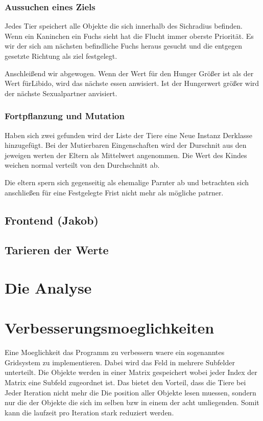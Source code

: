 \documentclass[12pt]{article}
\begin{document}
\subsubsection{Aussuchen eines Ziels}
Jedes Tier speichert alle Objekte die sich innerhalb des Sichradius befinden.
Wenn ein Kaninchen ein Fuchs sieht hat die Flucht immer oberste Priorität.
Es wir der sich am nächsten befindliche Fuchs heraus gesucht und die entgegen gesetzte Richtung als ziel festgelegt.

Anschleißend wir abgewogen.
Wenn der Wert für den Hunger Größer ist als der Wert fürLibido, wird das nächste essen anwisiert.
Ist der Hungerwert größer wird der nächste Sexualpartner anvisiert.
\subsubsection{Fortpflanzung und Mutation}
Haben sich zwei gefunden wird der Liste der Tiere eine Neue Instanz Derklasse hinzugefügt.
Bei der Mutierbaren Eingenschaften wird der Durschnit aus den jeweigen werten der Eltern als Mittelwert angenommen.
Die Wert des Kindes weichen normal verteilt von den Durchschnitt ab.

Die eltern spern sich gegenseitig als ehemalige Parnter ab und betrachten sich anschließen für eine Festgelegte Frist nicht mehr als mögliche patrner.

\subsection{Frontend (Jakob)}
\subsection{Tarieren der Werte}
\section{Die Analyse}
\section{Verbesserungsmoeglichkeiten}
Eine Moeglichkeit das Programm zu verbessern waere ein sogenanntes Gridsystem zu implementieren.
Dabei wird das Feld in mehrere Subfelder unterteilt.
Die Objekte werden in einer Matrix gespeichert wobei jeder Index der Matrix eine Subfeld zugeordnet ist.
Das bietet den Vorteil, dass die Tiere bei Jeder Iteration nicht mehr die Die position aller Objekte lesen muessen, sondern nur die der Objekte die sich im selben bzw in einem der acht umliegenden.
Somit kann die laufzeit pro Iteration stark reduziert werden.
\end{document}
